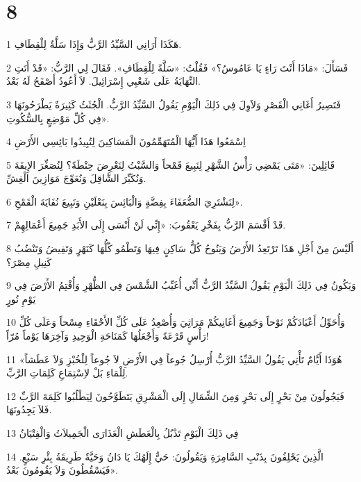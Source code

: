 \chapter{8}

\par 1 هَكَذَا أَرَانِي السَّيِّدُ الرَّبُّ وَإِذَا سَلَّةٌ لِلْقِطَافِ.
\par 2 فَسَأَلَ: «مَاذَا أَنْتَ رَاءٍ يَا عَامُوسُ؟» فَقُلْتُ: «سَلَّةً لِلْقِطَافِ». فَقَالَ لِي الرَّبُّ: «قَدْ أَتَتِ النِّهَايَةُ عَلَى شَعْبِي إِسْرَائِيلَ. لاَ أَعُودُ أَصْفَحُ لَهُ بَعْدُ.
\par 3 فَتَصِيرُ أَغَانِي الْقَصْرِ وَلاَوِلَ فِي ذَلِكَ الْيَوْمِ يَقُولُ السَّيِّدُ الرَّبُّ. الْجُثَثُ كَثِيرَةٌ يَطْرَحُونَهَا فِي كُلِّ مَوْضِعٍ بِالسُّكُوتِ».
\par 4 اِسْمَعُوا هَذَا أَيُّهَا الْمُتَهَمِّمُونَ الْمَسَاكِينَ لِتُبِيدُوا بَائِسِي الأَرْضِ
\par 5 قَائِلِينَ: «مَتَى يَمْضِي رَأْسُ الشَّهْرِ لِنَبِيعَ قَمْحاً وَالسَّبْتُ لِنَعْرِضَ حِنْطَةً؟ لِنُصَغِّرَ الإِيفَةَ وَنُكَبِّرَ الشَّاقِلَ وَنُعَوِّجَ مَوَازِينَ الْغِشِّ.
\par 6 لِنَشْتَرِيَ الضُّعَفَاءَ بِفِضَّةٍ وَالْبَائِسَ بِنَعْلَيْنِ وَنَبِيعَ نُفَايَةَ الْقَمْحِ».
\par 7 قَدْ أَقْسَمَ الرَّبُّ بِفَخْرِ يَعْقُوبَ: «إِنِّي لَنْ أَنْسَى إِلَى الأَبَدِ جَمِيعَ أَعْمَالِهِمْ.
\par 8 أَلَيْسَ مِنْ أَجْلِ هَذَا تَرْتَعِدُ الأَرْضُ وَيَنُوحُ كُلُّ سَاكِنٍ فِيهَا وَتَطْمُو كُلُّهَا كَنَهْرٍ وَتَفِيضُ وَتَنْضُبُ كَنِيلِ مِصْرَ؟
\par 9 وَيَكُونُ فِي ذَلِكَ الْيَوْمِ يَقُولُ السَّيِّدُ الرَّبُّ أَنِّي أُغَيِّبُ الشَّمْسَ فِي الظُّهْرِ وَأُقْتِمُ الأَرْضَ فِي يَوْمِ نُورٍ
\par 10 وَأُحَوِّلُ أَعْيَادَكُمْ نَوْحاً وَجَمِيعَ أَغَانِيكُمْ مَرَاثِيَ وَأُصْعِدُ عَلَى كُلِّ الأَحْقَاءِ مِسْحاً وَعَلَى كُلِّ رَأْسٍ قَرْعَةً وَأَجْعَلُهَا كَمَنَاحَةِ الْوَحِيدِ وَآخِرَهَا يَوْماً مُرّاً!
\par 11 «هُوَذَا أَيَّامٌ تَأْتِي يَقُولُ السَّيِّدُ الرَّبُّ أُرْسِلُ جُوعاً فِي الأَرْضِ لاَ جُوعاً لِلْخُبْزِ وَلاَ عَطَشاً لِلْمَاءِ بَلْ لاِسْتِمَاعِ كَلِمَاتِ الرَّبِّ.
\par 12 فَيَجُولُونَ مِنْ بَحْرٍ إِلَى بَحْرٍ وَمِنَ الشِّمَالِ إِلَى الْمَشْرِقِ يَتَطَوَّحُونَ لِيَطْلُبُوا كَلِمَةَ الرَّبِّ فَلاَ يَجِدُونَهَا.
\par 13 فِي ذَلِكَ الْيَوْمِ تَذْبُلُ بِالْعَطَشِ الْعَذَارَى الْجَمِيلاَتُ وَالْفِتْيَانُ
\par 14 الَّذِينَ يَحْلِفُونَ بِذَنْبِ السَّامِرَةِ وَيَقُولُونَ: حَيٌّ إِلَهُكَ يَا دَانُ وَحَيَّةٌ طَرِيقَةُ بِئْرِ سَبْعٍ. فَيَسْقُطُونَ وَلاَ يَقُومُونَ بَعْدُ».


